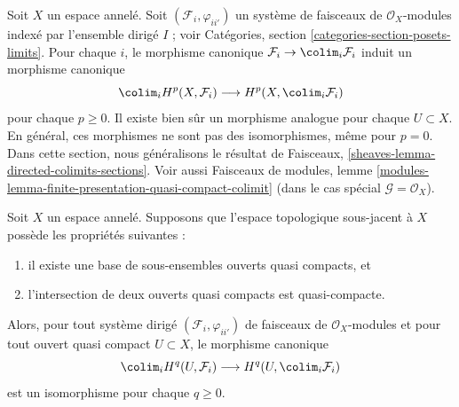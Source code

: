 \noindent

Soit $X$ un espace annelé. Soit $(\mathcal{F}_i, \varphi_{ii'})$ un système de faisceaux de $\mathcal{O}_X$-modules indexé par l'ensemble dirigé $I$ ; voir Catégories, section \ref{categories-section-posets-limits}. Pour chaque $i$, le morphisme canonique
$\mathcal{F}_i \to \colim_i \mathcal{F}_i$ induit un morphisme canonique
$$
\colim_i H^p(X, \mathcal{F}_i)
\longrightarrow
H^p(X, \colim_i \mathcal{F}_i)
$$
pour chaque $p \geq 0$. Il existe bien sûr un morphisme analogue pour chaque $U \subset X$. En général, ces morphismes ne sont pas des isomorphismes, même pour $p = 0$. Dans cette section, nous généralisons le résultat de Faisceaux, \ref{sheaves-lemma-directed-colimits-sections}. Voir aussi Faisceaux de modules, lemme \ref{modules-lemma-finite-presentation-quasi-compact-colimit}
(dans le cas spécial $\mathcal{G} = \mathcal{O}_X$).

\begin{lemma}

\label{lemma-quasi-separated-cohomology-colimit}
Soit $X$ un espace annelé. Supposons que l'espace topologique sous-jacent à $X$ possède les propriétés suivantes :
\begin{enumerate}
\item il existe une base de sous-ensembles ouverts quasi compacts, et
\item l'intersection de deux ouverts quasi compacts est quasi-compacte.
\end{enumerate}
Alors, pour tout système dirigé $(\mathcal{F}_i, \varphi_{ii'})$ de faisceaux de $\mathcal{O}_X$-modules et pour tout ouvert quasi compact $U \subset X$, le morphisme canonique $$
\colim_i H^q(U, \mathcal{F}_i)
\longrightarrow
H^q(U, \colim_i \mathcal{F}_i)
$$ est un isomorphisme pour chaque $q \geq 0$.
\end{lemma}

